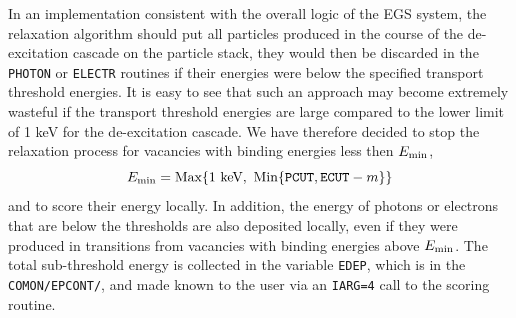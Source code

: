 In an implementation consistent with the overall logic
of the EGS system, the relaxation algorithm should
put all particles produced in the course of the
de-excitation cascade on the particle stack, they would
then be discarded in the {\tt PHOTON} or {\tt ELECTR}
routines if their energies were below the specified
transport threshold energies. It is easy to see that
such an approach may become extremely wasteful if
the transport threshold energies are large compared to
the lower limit of 1 keV for the de-excitation cascade.
We have therefore decided to stop the relaxation process
for vacancies with binding energies less then $E_{\rm min}$,
\begin{equation}
E_{\rm min} = \mbox{Max} \{ 1~\mbox{keV},~\mbox{Min}
\{ {\tt PCUT}, {\tt ECUT} - m \} \}
\end{equation}
and to score their energy locally. In addition,
the energy of photons or electrons that are below
the thresholds are also deposited locally, even if
they were produced in transitions from vacancies
with binding energies above $E_{\rm min}$.
The total sub-threshold energy is collected in
the variable {\tt EDEP}, which is in the {\tt COMON/EPCONT/},
and made known to the
user via an {\tt IARG=4} call to the scoring routine.

